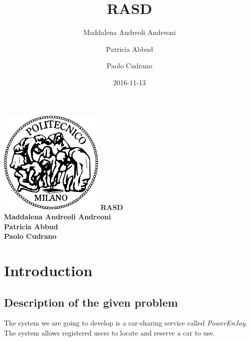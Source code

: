 \documentclass{article}
\title{RASD}
\date{2016-11-13}
\author{
	Maddalena Andreoli Andreoni
	\and
	Patricia Abbud
	\and
	Paolo Cudrano
}
\begin{document}
	\begin{titlepage}
	    \centering
	    \includegraphics[width=5cm]{img/polimi_logo.png} %
	    \vfill
	    {\bfseries\Large
	        RASD\\
	        \vskip4cm
	        Maddalena Andreoli Andreoni\\
					Patricia Abbud\\
	        Paolo Cudrano\\
	    }    
	    \vfill
	    \vfill
	\end{titlepage}

	\tableofcontents
	\newpage	
  
  \section{Introduction}
		\subsection{Description of the given problem}

The system we are going to develop is a car-sharing service called \textit{PowerEnJoy}. The system allows registered users to locate and reserve a car to use.
		
	\newpage
	\begin{appendix}
	  \listoffigures
	  \listoftables
	\end{appendix}
\end{document}
